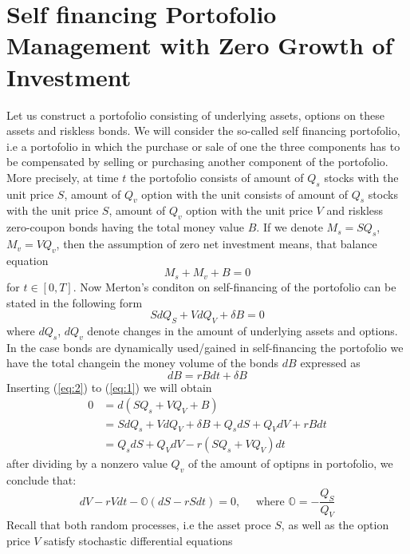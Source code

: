 \documentclass[a4paper]{article}
\begin{document}
\section{Self financing Portofolio Management with Zero Growth of Investment}
Let us construct a portofolio consisting of underlying assets, options on these assets and riskless bonds. We will consider the so-called self financing portofolio, i.e a portofolio in which the purchase or sale of one the three components has to be compensated by selling or purchasing another component of the portofolio.
More precisely, at time $t$ the portofolio consists of amount of $Q_s$ stocks with the unit price $S$, amount of $Q_v$ option with the unit consists of amount of $Q_s$ stocks with the unit price $S$, amount of $Q_v$ option with the unit price $V$ and riskless zero-coupon bonds having the total money value $B$. If we denote $M_s = SQ_s$, $M_v = VQ_v$,
then the assumption of zero net investment means, that balance equation 
\begin{equation}
    M_s + M_v + B = 0
\end{equation}
for $t\in[0, T]$. Now Merton's conditon on self-financing of the portofolio can be stated in the following form
\begin{equation}
    S d Q_{S}+V d Q_{V}+\delta B=0
    \label{eq:1}
\end{equation}
where $dQ_s$, $dQ_v$ denote changes in the amount of underlying assets and options.  In the case bonds are dynamically used/gained in self-financing the portofolio we have the total changein the money volume of the bonds $dB$ expressed as
\begin{equation}
    d B=r B d t+\delta B
    \label{eq:2}
\end{equation}
Inserting (\ref{eq:2}) to (\ref{eq:1}) we will obtain 
\begin{align}
    0 &=d\left(S Q_{s}+V Q_{V}+B\right) \\
    &=S d Q_{s}+V d Q_{V}+\delta B+Q_{s} d S+Q_{V} d V+r B d t \\
    &=Q_{s} d S+Q_{V} d V-r\left(S Q_{s}+V Q_{V}\right) d t
\end{align}
after dividing by a nonzero value $Q_v$ of the amount of optipns in portofolio, we conclude that:
\begin{equation}
    d V-r V d t-\mathbb{O}(d S-r S d t)=0, \quad \text { where } \mathbb{O}=-\frac{Q_{S}}{Q_{V}}
\end{equation}
Recall that both random processes, i.e the asset proce $S$, as well as the option price $V$ satisfy stochastic differential equations
\end{document}
